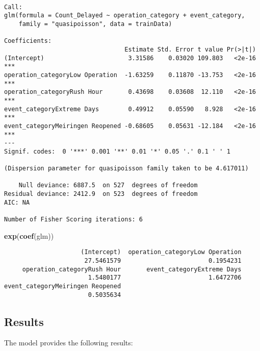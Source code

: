 \documentclass[
]{article}
\newenvironment{Shaded}{\begin{snugshade}}{\end{snugshade}}
\newcommand{\FunctionTok}[1]{\textcolor[rgb]{0.13,0.29,0.53}{\textbf{#1}}}
\newcommand{\NormalTok}[1]{#1}
\begin{document}
\begin{verbatim}

Call:
glm(formula = Count_Delayed ~ operation_category + event_category, 
    family = "quasipoisson", data = trainData)

Coefficients:
                                 Estimate Std. Error t value Pr(>|t|)    
(Intercept)                       3.31586    0.03020 109.803   <2e-16 ***
operation_categoryLow Operation  -1.63259    0.11870 -13.753   <2e-16 ***
operation_categoryRush Hour       0.43698    0.03608  12.110   <2e-16 ***
event_categoryExtreme Days        0.49912    0.05590   8.928   <2e-16 ***
event_categoryMeiringen Reopened -0.68605    0.05631 -12.184   <2e-16 ***
---
Signif. codes:  0 '***' 0.001 '**' 0.01 '*' 0.05 '.' 0.1 ' ' 1

(Dispersion parameter for quasipoisson family taken to be 4.617011)

    Null deviance: 6887.5  on 527  degrees of freedom
Residual deviance: 2412.9  on 523  degrees of freedom
AIC: NA

Number of Fisher Scoring iterations: 6
\end{verbatim}

\begin{Shaded}
\begin{Highlighting}[]
\FunctionTok{exp}\NormalTok{(}\FunctionTok{coef}\NormalTok{(glm))}
\end{Highlighting}
\end{Shaded}

\begin{verbatim}
                     (Intercept)  operation_categoryLow Operation 
                      27.5461579                        0.1954231 
     operation_categoryRush Hour       event_categoryExtreme Days 
                       1.5480177                        1.6472706 
event_categoryMeiringen Reopened 
                       0.5035634 
\end{verbatim}

\subsection{Results}\label{results-1}

The model provides the following results:
\end{document}
